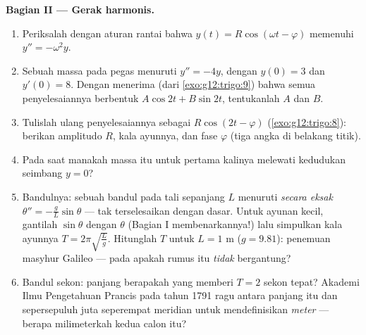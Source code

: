 \begin{problem}
\medskip
\noindent\textbf{Bagian II --- Gerak harmonis.}
\begin{enumerate}[resume]
  \item Periksalah dengan aturan rantai bahwa
        $y(t) = R\cos(\omega t - \varphi)$ memenuhi
        $y'' = -\omega^2 y$.
  \item Sebuah massa pada pegas menuruti $y'' = -4y$, dengan
        $y(0) = 3$ dan $y'(0) = 8$. Dengan menerima (dari
        \cref{exo:g12:trigo:9}) bahwa semua penyelesaiannya berbentuk
        $A\cos 2t + B\sin 2t$, tentukanlah $A$ dan $B$.
  \item Tulislah ulang penyelesaiannya sebagai $R\cos(2t - \varphi)$
        (\cref{exo:g12:trigo:8}): berikan amplitudo $R$, kala
        ayunnya, dan fase $\varphi$ (tiga angka di belakang titik).
  \item Pada saat manakah massa itu untuk pertama kalinya melewati
        kedudukan seimbang $y = 0$?
  \item Bandulnya: sebuah bandul pada tali sepanjang $L$ menuruti
        \emph{secara eksak} $\theta'' = -\frac gL \sin\theta$ ---
        tak terselesaikan dengan  dasar. Untuk ayunan kecil,
        gantilah $\sin\theta$ dengan $\theta$ (Bagian I membenarkannya!)
        lalu simpulkan kala ayunnya
        $T = 2\pi\sqrt{\frac Lg}$. Hitunglah $T$ untuk
        $L = 1$ m ($g = 9.81$): penemuan masyhur Galileo ---
        pada apakah rumus itu \emph{tidak} bergantung?
  \item Bandul sekon: panjang berapakah yang memberi
        $T = 2$ sekon tepat? Akademi Ilmu Pengetahuan Prancis pada tahun
        1791 ragu antara panjang itu dan sepersepuluh juta
        seperempat meridian untuk mendefinisikan \emph{meter} --- berapa
        milimeterkah  kedua calon itu?
\end{enumerate}


\end{problem}

